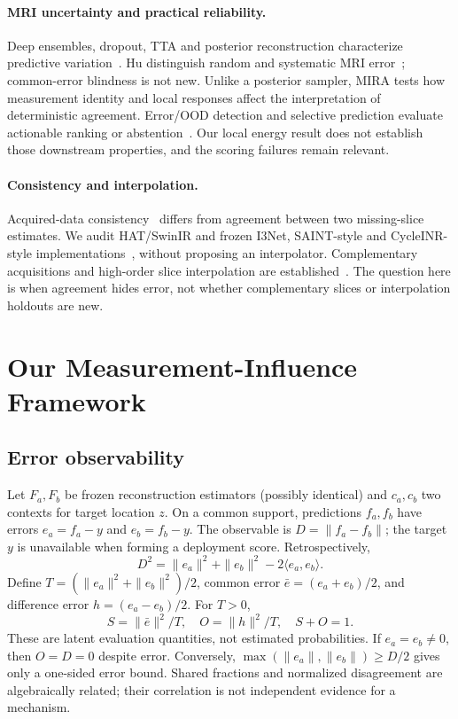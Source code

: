 \documentclass[10pt,twocolumn,letterpaper]{article}
\begin{document}
\paragraph{MRI uncertainty and practical reliability.}
Deep ensembles, dropout, TTA and posterior reconstruction characterize predictive variation~\cite{lakshminarayanan2017ensembles,gal2016dropout,wang2019tta,edupuganti2021uncertainty,narnhofer2022bayesian,luo2023diffusion}. Hu \etal distinguish random and systematic MRI error~\cite{hu2021predict}; common-error blindness is not new. Unlike a posterior sampler, MIRA tests how measurement identity and local responses affect the interpretation of deterministic agreement. Error/OOD detection and selective prediction evaluate actionable ranking or abstention~\cite{hendrycks2017baseline,geifman2017selective}. Our local energy result does not establish those downstream properties, and the scoring failures remain relevant.

\paragraph{Consistency and interpolation.}
Acquired-data consistency~\cite{lustig2010spirit} differs from agreement between two missing-slice estimates. We audit HAT/SwinIR and frozen I3Net, SAINT-style and CycleINR-style implementations~\cite{chen2023hat,liang2021swinir,song2024i3net,peng2020saint,fang2024cycleinr}, without proposing an interpolator. Complementary acquisitions and high-order slice interpolation are established~\cite{greenspan2002interslice,nicastro2022shift,horvath2017highorder}. The question here is when agreement hides error, not whether complementary slices or interpolation holdouts are new.

\section{Our Measurement-Influence Framework}
\subsection{Error observability}
Let $F_a,F_b$ be frozen reconstruction estimators (possibly identical) and $c_a,c_b$ two contexts for target location $z$. On a common support, predictions $f_a,f_b$ have errors $e_a=f_a-y$ and $e_b=f_b-y$. The observable is $D=\|f_a-f_b\|$; the target $y$ is unavailable when forming a deployment score. Retrospectively,
\begin{equation}
D^2=\|e_a\|^2+\|e_b\|^2-2\langle e_a,e_b\rangle .\label{eq:difference}
\end{equation}
Define $T=(\|e_a\|^2+\|e_b\|^2)/2$, common error $\bar e=(e_a+e_b)/2$, and difference error $h=(e_a-e_b)/2$. For $T>0$,
\begin{equation}
S=\|\bar e\|^2/T,\quad O=\|h\|^2/T,\quad S+O=1.\label{eq:energy}
\end{equation}
These are latent evaluation quantities, not estimated probabilities. If $e_a=e_b\ne0$, then $O=D=0$ despite error. Conversely, $\max(\|e_a\|,\|e_b\|)\ge D/2$ gives only a one-sided error bound. Shared fractions and normalized disagreement are algebraically related; their correlation is not independent evidence for a mechanism.
\end{document}
